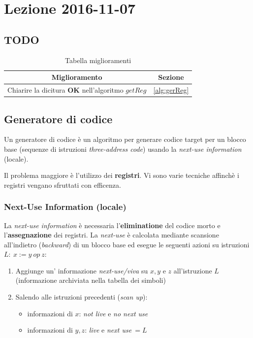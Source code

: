 \section{Lezione 2016-11-07}
\subsection{TODO}
\begin{table}[H]
\begin{center}
\begin{tabular}{|p{\textwidth}|c|}
\hline
\multicolumn{1}{|c|}{\textbf{Miglioramento}} & \textbf{Sezione} \\ \hline
Chiarire la dicitura \textbf{OK} nell'algoritmo $getReg$ &
\ref{alg:gerReg} \\ \hline
\end{tabular}
\end{center}
\caption{Tabella miglioramenti}
\label{tab:tab_todo}
\end{table}

\subsection{Generatore di codice}
\begin{definition}
Un generatore di codice \`e un algoritmo per generare codice target per un
blocco base (sequenze di istruzioni \textit{three-address code}) usando la
\textit{next-use information} (locale).
\end{definition}

Il problema maggiore \`e l'utilizzo dei \textbf{registri}. Vi sono varie
tecniche affinch\`e i registri vengano sfruttati con efficenza.

\subsubsection{Next-Use Information (locale)}
La \textit{next-use information} \`e necessaria l'\textbf{eliminatione} del
codice morto e l'\textbf{assegnazione} dei registri. La \textit{next-use} \`e
calcolata mediante scansione all'indietro (\textit{backward}) di un blocco base
ed esegue le seguenti azioni su istruzioni $L: \ x := y \ op \ z$:
\begin{enumerate}
\item Aggiunge un' informazione \textit{next-use/viva} su $x,y$ e $z$
all'istruzione $L$ (informazione archiviata nella tabella dei simboli)
\item Salendo alle istruzioni precedenti (\textit{scan up}):
\begin{itemize}
\item informazioni di $x$: \textit{not live} e \textit{no next use}
\item informazioni di $y,z$: \textit{live} e \textit{next use}$\ =L$
\end{itemize}
\end{enumerate}

